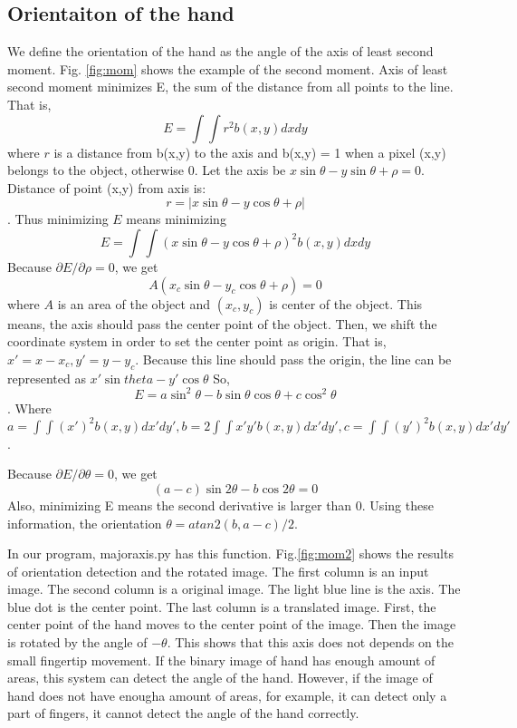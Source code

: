 \subsection{Orientaiton of the hand}
We define the orientation of the hand as the angle of the axis of least second moment.
Fig. \ref{fig:mom} shows the example of the second moment.
Axis of least second moment minimizes E, the sum of the distance from all points to the line. That is,
$$E = \int \int r^2 b(x,y) dxdy$$
where $r$ is a distance from b(x,y) to the axis and b(x,y) = 1 when a pixel (x,y) belongs to the object, otherwise 0.
Let the axis be $x\sin{\theta} - y\sin{\theta} + \rho = 0$.
Distance of point (x,y) from axis is:
$$r = |x\sin{\theta}-y\cos{\theta}+\rho|$$.
Thus minimizing $E$ means minimizing
$$E = \int\int (x\sin{\theta}-y\cos{\theta}+\rho)^2 b(x,y)dxdy$$
Because $\partial E / \partial \rho = 0$, we get
$$A(x_c \sin{\theta} - y_c \cos{\theta} + \rho) = 0$$
where $A$ is an area of the object and $(x_c,y_c)$ is center of the object.
This means, the axis should pass the center point of the object.
Then, we shift the coordinate system in order to set the center point as origin.
That is, 
$x'= x - x_c, y' = y - y_c$.
Because this line should pass the origin, the line can be represented as
$x'\sin{theta}-y'\cos{\theta}$
So, $$E = a \sin^2{\theta} - b\sin{\theta}\cos{\theta} + c\cos^2{\theta}$$.
Where $a = \int\int (x')^2 b(x,y) dx'dy', b = 2\int\int x'y' b(x,y) dx'dy', 
c = \int\int (y')^2 b(x,y)dx'dy'$.\par
Because $\partial E / \partial \theta = 0$, we get
$$(a-c)\sin{2\theta} - b\cos{2\theta} = 0$$
Also, minimizing E means the second derivative is larger than 0.
Using these information, the orientation $\theta = atan2(b,a-c)/2$.\par
In our program, majoraxis.py has this function.
Fig.\ref{fig:mom2} shows the results of orientation detection and the rotated image.
The first column is an input image.
The second column is a original image. The light blue line is the axis. The blue dot is the center point.
The last column is a translated image. First, the center point of the hand moves to the center point of the image.
Then the image is rotated by the angle of $-\theta$.
This shows that this axis does not depends on the small fingertip movement.
If the binary image of hand has enough amount of areas, this system can detect the angle of the hand.
However, if the image of hand does not have enougha amount of areas, for example, it can detect only a part of fingers,
it cannot detect the angle of the hand correctly.

